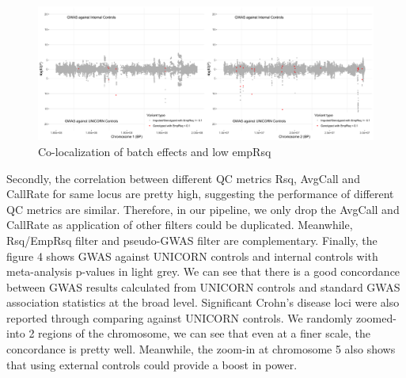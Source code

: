 \documentclass[12pt]{amsart}
\begin{document}
\begin{figure}[H]
    \centering
    \includegraphics[width=\textwidth]{qc/empRsq.png}
    \caption{Co-localization of batch effects and low empRsq}
    \label{fig:emp_rsq}
\end{figure}

Secondly, the correlation between different QC metrics Rsq, AvgCall and CallRate for same locus are pretty high, suggesting the performance of different QC metrics are similar. Therefore, in our pipeline, we only drop the AvgCall and CallRate as application of other filters could be duplicated. Meanwhile, Rsq/EmpRsq filter and pseudo-GWAS filter are complementary. Finally, the figure 4 shows GWAS against UNICORN controls and internal controls with meta-analysis p-values in light grey. We can see that there is a good concordance between GWAS results calculated from UNICORN controls and standard GWAS association statistics at the broad level. Significant Crohn's disease loci were also reported through comparing against UNICORN controls. We randomly zoomed-into 2 regions of the chromosome, we can see that even at a finer scale, the concordance is pretty well. Meanwhile, the zoom-in at chromosome 5 also shows that using external controls could provide a boost in power.
\end{document}
